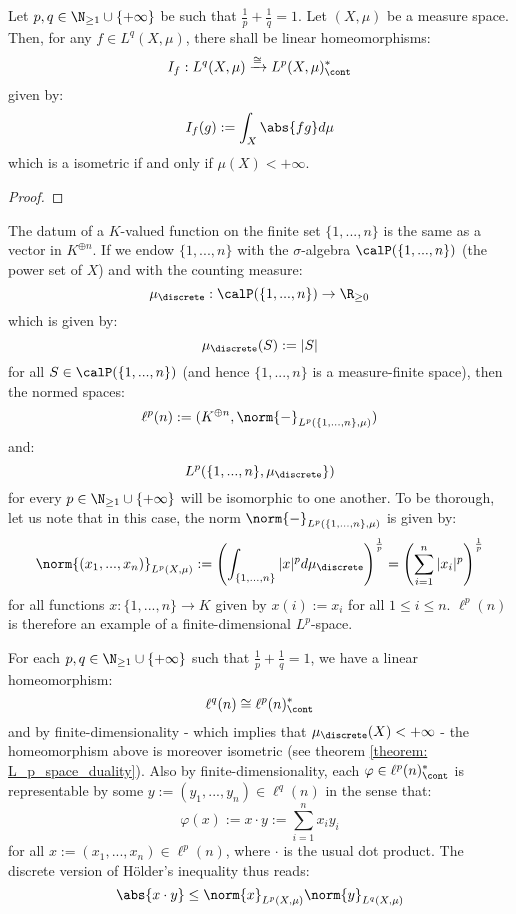         \begin{theorem} \label{theorem: L_p_space_duality}
            Let $p, q \in \N_{\geq 1} \cup \{+\infty\}$ be such that $\frac1p + \frac1q = 1$. Let $(X, \mu)$ be a measure space. Then, for any $f \in L^q(X, \mu)$, there shall be linear homeomorphisms:
                $$I_f: L^q(X, \mu) \xrightarrow[]{\cong} L^p(X, \mu)^*_{\cont}$$
            given by:
                $$I_f(g) := \int_X \abs{fg} d\mu$$
            which is a isometric if and only if $\mu(X) < +\infty$.
        \end{theorem}
            \begin{proof}
                
            \end{proof}
            
        \begin{example} \label{example: ell_p_spaces}
            The datum of a $K$-valued function on the finite set $\{1, ..., n\}$ is the same as a vector in $K^{\oplus n}$. If we endow $\{1, ..., n\}$ with the $\sigma$-algebra $\calP(\{1, ..., n\})$ (the power set of $X$) and with the counting measure:
                $$\mu_{\discrete}: \calP(\{1, ..., n\}) \to \R_{\geq 0}$$
            which is given by:
                $$\mu_{\discrete}(S) := |S|$$
            for all $S \in \calP(\{1, ..., n\})$ (and hence $\{1, ..., n\}$ is a measure-finite space), then the normed spaces:
                $$\ell^p(n) := (K^{\oplus n}, \norm{-}_{L^p(\{1, ..., n\}, \mu)})$$
            and:
                $$L^p(\{1, ..., n\}, \mu_{\discrete}\})$$
            for every $p \in \N_{\geq 1} \cup \{+\infty\}$ will be isomorphic to one another. To be thorough, let us note that in this case, the norm $\norm{-}_{L^p(\{1, ..., n\}, \mu)}$ is given by:
                $$\norm{(x_1, ..., x_n)}_{L^p(X, \mu)} := \left( \int_{\{1, ..., n\}} |x|^p d\mu_{\discrete} \right)^{\frac1p} = \left( \sum_{i = 1}^n |x_i|^p \right)^{\frac1p}$$
            for all functions $x: \{1, ..., n\} \to K$ given by $x(i) := x_i$ for all $1 \leq i \leq n$. $\ell^p(n)$ is therefore an example of a finite-dimensional $L^p$-space.

            For each $p, q \in \N_{\geq 1} \cup \{+\infty\}$ such that $\frac1p + \frac1q = 1$, we have a linear homeomorphism:
                $$\ell^q(n) \cong \ell^p(n)^*_{\cont}$$
            and by finite-dimensionality - which implies that $\mu_{\discrete}(X) < +\infty$ - the homeomorphism above is moreover isometric (see theorem \ref{theorem: L_p_space_duality}). Also by finite-dimensionality, each $\varphi \in \ell^p(n)^*_{\cont}$ is representable by some $y := (y_1, ..., y_n) \in \ell^q(n)$ in the sense that:
                $$\varphi(x) := x \cdot y := \sum_{i = 1}^n x_i y_i$$
            for all $x := (x_1, ..., x_n) \in \ell^p(n)$, where $\cdot$ is the usual dot product. The discrete version of H\"older's inequality thus reads:
                $$\abs{x \cdot y} \leq \norm{x}_{L^p(X, \mu)} \norm{y}_{L^q(X, \mu)}$$


\end{example}
